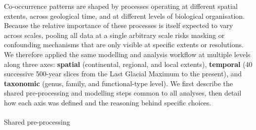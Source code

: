 \documentclass[
  12pt,
]{article}
\makeatletter
\let\oldparagraph\paragraph
\renewcommand{\paragraph}{
    \@ifstar
      \xxxParagraphStar
      \xxxParagraphNoStar
  }
\newcommand{\xxxParagraphStar}[1]{\oldparagraph*{#1}\mbox{}}
\newcommand{\xxxParagraphNoStar}[1]{\oldparagraph{#1}\mbox{}}
\makeatother
\begin{document}
Co-occurrence patterns are shaped by processes operating at different
spatial extents, across geological time, and at different levels of
biological organisation. Because the relative importance of these
processes is itself expected to vary across scales, pooling all data at
a single arbitrary scale risks masking or confounding mechanisms that
are only visible at specific extents or resolutions. We therefore
applied the same modelling and analysis workflow at multiple levels
along three axes: \textbf{spatial} (continental, regional, and local
extents), \textbf{temporal} (40 successive 500-year slices from the Last
Glacial Maximum to the present), and \textbf{taxonomic} (genus, family,
and functional-type level). We first describe the shared pre-processing
and modelling steps common to all analyses, then detail how each axis
was defined and the reasoning behind specific choices.

\paragraph{Shared pre-processing}\label{shared-pre-processing}
\end{document}
